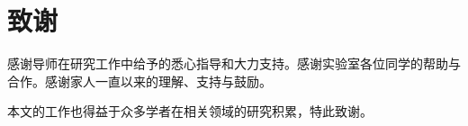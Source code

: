 
\cleardoublepage{}
{}
\titlespacing{\chapter}{0pt}{-1em}{1em}
\chapter*{致谢}

感谢导师在研究工作中给予的悉心指导和大力支持。感谢实验室各位同学的帮助与合作。感谢家人一直以来的理解、支持与鼓励。

本文的工作也得益于众多学者在相关领域的研究积累，特此致谢。
